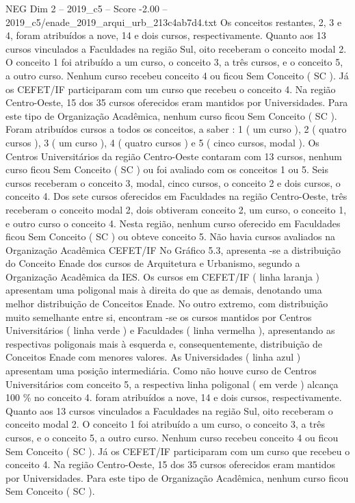 \begin{textsample}{NEG Dim 2 – 2019\_c5 – Score -2.00 – 2019\_c5/enade\_2019\_arqui\_urb\_213c4ab7d4.txt}
Os conceitos restantes, 2, 3 e 4, foram atribuídos a nove, 14 e dois cursos, respectivamente.
Quanto aos 13 cursos vinculados a Faculdades na região Sul, oito receberam o conceito modal 2.
O conceito 1 foi atribuído a um curso, o conceito 3, a três cursos, e o conceito 5, a outro curso.
Nenhum curso recebeu conceito 4 ou ficou Sem Conceito ( SC ).
Já os CEFET/IF participaram com um curso que recebeu o conceito 4.
Na região Centro-Oeste, 15 dos 35 cursos oferecidos eram mantidos por Universidades.
Para este tipo de Organização Acadêmica, nenhum curso ficou Sem Conceito ( SC ).
Foram atribuídos cursos a todos os conceitos, a saber : 1 ( um curso ), 2 ( quatro cursos ), 3 ( um curso ), 4 ( quatro cursos ) e 5 ( cinco cursos, modal ).
Os Centros Universitários da região Centro-Oeste contaram com 13 cursos, nenhum curso ficou Sem Conceito ( SC ) ou foi avaliado com os conceitos 1 ou 5.
Seis cursos receberam o conceito 3, modal, cinco cursos, o conceito 2 e dois cursos, o conceito 4.
Dos sete cursos oferecidos em Faculdades na região Centro-Oeste, três receberam o conceito modal 2, dois obtiveram conceito 2, um curso, o conceito 1, e outro curso o conceito 4.
Nesta região, nenhum curso oferecido em Faculdades ficou Sem Conceito ( SC ) ou obteve conceito 5.
Não havia cursos avaliados na Organização Acadêmica CEFET/IF No Gráfico 5.3, apresenta -se a distribuição do Conceito Enade dos cursos de Arquitetura e Urbanismo, segundo a Organização Acadêmica da IES.
Os cursos em CEFET/IF ( linha laranja ) apresentam uma poligonal mais à direita do que as demais, denotando uma melhor distribuição de Conceitos Enade.
No outro extremo, com distribuição muito semelhante entre si, encontram -se os cursos mantidos por Centros Universitários ( linha verde ) e Faculdades ( linha vermelha ), apresentando as respectivas poligonais mais à esquerda e, consequentemente, distribuição de Conceitos Enade com menores valores.
As Universidades ( linha azul ) apresentam uma posição intermediária.
Como não houve curso de Centros Universitários com conceito 5, a respectiva linha poligonal ( em verde ) alcança 100 \% no conceito 4. foram atribuídos a nove, 14 e dois cursos, respectivamente.
Quanto aos 13 cursos vinculados a Faculdades na região Sul, oito receberam o conceito modal 2.
O conceito 1 foi atribuído a um curso, o conceito 3, a três cursos, e o conceito 5, a outro curso.
Nenhum curso recebeu conceito 4 ou ficou Sem Conceito ( SC ).
Já os CEFET/IF participaram com um curso que recebeu o conceito 4.
Na região Centro-Oeste, 15 dos 35 cursos oferecidos eram mantidos por Universidades.
Para este tipo de Organização Acadêmica, nenhum curso ficou Sem Conceito ( SC ).

\end{textsample}
